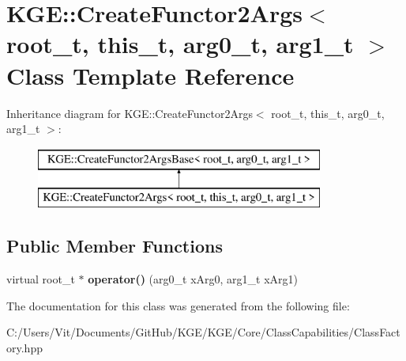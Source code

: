 \hypertarget{class_k_g_e_1_1_create_functor2_args}{\section{K\-G\-E\-:\-:Create\-Functor2\-Args$<$ root\-\_\-t, this\-\_\-t, arg0\-\_\-t, arg1\-\_\-t $>$ Class Template Reference}
\label{class_k_g_e_1_1_create_functor2_args}
}
Inheritance diagram for K\-G\-E\-:\-:Create\-Functor2\-Args$<$ root\-\_\-t, this\-\_\-t, arg0\-\_\-t, arg1\-\_\-t $>$\-:\begin{figure}[H]
\begin{center}
\leavevmode
\includegraphics[height=2.000000cm]{class_k_g_e_1_1_create_functor2_args}
\end{center}
\end{figure}
\subsection*{Public Member Functions}
\begin{DoxyCompactItemize}
\item 
\hypertarget{class_k_g_e_1_1_create_functor2_args_a3b0c62d7f1d9c72625e74047cecc5967}{virtual root\-\_\-t $\ast$ {\bfseries operator()} (arg0\-\_\-t x\-Arg0, arg1\-\_\-t x\-Arg1)}\label{class_k_g_e_1_1_create_functor2_args_a3b0c62d7f1d9c72625e74047cecc5967}

\end{DoxyCompactItemize}


The documentation for this class was generated from the following file\-:\begin{DoxyCompactItemize}
\item 
C\-:/\-Users/\-Vit/\-Documents/\-Git\-Hub/\-K\-G\-E/\-K\-G\-E/\-Core/\-Class\-Capabilities/Class\-Factory.\-hpp\end{DoxyCompactItemize}

